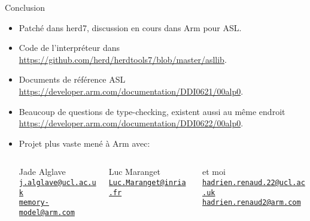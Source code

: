 \documentclass[10pt, dvipsnames]{beamer}
\newcommand\mailto[1]{\href{mailto:#1}{\nolinkurl{#1}}}
\begin{document}
\begin{frame}{Conclusion}
  \begin{itemize}
    \item Patch\'e dans herd7, discussion en cours dans Arm pour ASL.

    \vfill
    \item Code de l'interpr\'eteur dans
      \url{https://github.com/herd/herdtools7/blob/master/asllib}.

    \vfill
    \item Documents de r\'ef\'erence ASL
      \url{https://developer.arm.com/documentation/DDI0621/00alp0}.

    \vfill
    \item Beaucoup de questions de type-checking, existent aussi au m\^eme endroit
      \url{https://developer.arm.com/documentation/DDI0622/00alp0}.

    \vfill
    \item
        Projet plus vaste men\'e \`a Arm avec:
        \vspace{1em}
        \begin{columns}[T]
          \begin{column}{.3\textwidth}
            \centering
            Jade Alglave \\
            \footnotesize\mailto{j.alglave@ucl.ac.uk} \\
            \footnotesize\mailto{memory-model@arm.com} \\
          \end{column}
          \begin{column}{.3\textwidth}
            \centering
            Luc Maranget \\
            \footnotesize\mailto{Luc.Maranget@inria.fr} \\
          \end{column}
          \begin{column}{.35\textwidth}
            \centering
            et moi \\
            \footnotesize\mailto{hadrien.renaud.22@ucl.ac.uk} \\
            \footnotesize\mailto{hadrien.renaud2@arm.com} \\
          \end{column}
        \end{columns}
  \end{itemize}
\end{frame}
\end{document}
